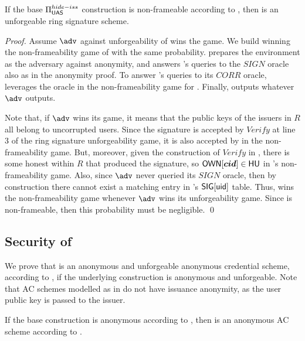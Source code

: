 \begin{theorem}
  If the base $\Pi_{\mathsf{UAS}}^{hide-iss}$ construction is non-frameable according to
  , then \CUASRing is an unforgeable ring signature
  scheme.
\end{theorem}

\begin{proof}
  Assume $\adv$ against unforgeability of \CUASRing wins the game. We build
  \advB winning the non-frameability game of \CUASGen with the same probability.
  \advB prepares the environment as the adversary \advB against anonymity,
  and answers \adv's queries to the $SIGN$ oracle also as in the anonymity
  proof. To answer \adv's queries to its $CORR$ oracle, \advB leverages the
  \ICORR oracle in the non-frameability game for \UAS. Finally, \advB outputs
  whatever $\adv$ outputs.

  Note that, if $\adv$ wins its game, it means that the public keys of the
  issuers in $R$ all belong to uncorrupted users. Since the signature is
  accepted by $Verify$ at line 3 of the ring signature unforgeability game,
  it is also accepted by \Verify in the \UAS non-frameability game. But,
  moreover, given the construction of $Verify$ in \CUASRing, there is some
  honest \usk within $R$ that produced the signature, so $\mathsf{OWN}[\boldsymbol{cid}] \in \mathsf{HU}$
  in \advB's non-frameability game. Also, since $\adv$ never queried its $SIGN$
  oracle, then by construction there cannot exist a matching entry in \advB's
  $\mathsf{SIG}[\mathsf{uid}]$ table. Thus, \advB wins the non-frameability game whenever
  $\adv$ wins its unforgeability game. Since \CUASGen is non-frameable, then
  this probability must be negligible.
  \qed
\end{proof}

\subsection{Security of \CUASAC}

We prove that \CUASAC is an anonymous and unforgeable anonymous credential
scheme, according to \cite{fhs19}, if the underlying \CUASGen construction
is anonymous and unforgeable. Note that AC schemes modelled as in \cite{fhs19}
do not have issuance anonymity, as the user public key is passed to the issuer.

\begin{theorem}
  \label{thm:anon-cuasac}
  If the base \CUASGen construction is anonymous according to
  , then \CUASAC is an anonymous AC scheme according
  to \cite{fhs19}.
\end{theorem}


